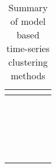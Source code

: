\begin{longtable}{p{}p{}p{}p{}p{}}
    \cite{} & & & & \\ \hline
    \cite{} & & & & \\ \hline
    \cite{} & & & & \\ \hline
    \cite{} & & & & \\ \hline
    \cite{} & & & & \\ \hline
    \cite{} & & & & \\ \hline
    \cite{} & & & & \\ \hline
    \cite{} & & & & \\ \hline
    \cite{} & & & & \\ \hline
    \cite{} & & & & \\ \hline
    \cite{} & & & & \\ \hline
    \cite{} & & & & \\ \hline
    \cite{} & & & & \\ \hline
    \cite{} & & & & \\ \hline
    \cite{} & & & & \\ \hline
    \cite{} & & & & \\ \hline
    \cite{} & & & & \\ \hline
    \cite{} & & & & \\ \hline
    \cite{} & & & & \\ \hline
    \hline
    \caption{Summary of model based time-series clustering methods}
    \label{tab:machine_learning_wt_cm_summary}
\end{longtable}


